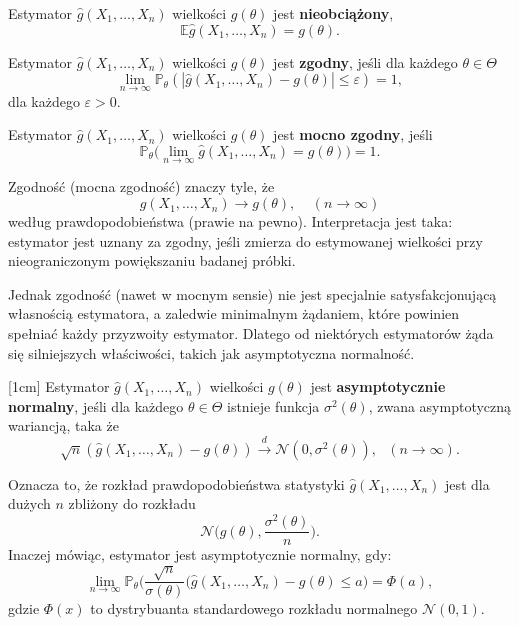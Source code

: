 \begin{definition}
Estymator $\hat{g}(X_1, \dots , X_n)$ wielkości $g(\theta)$ jest \textbf{nieobciążony},  
$$\mathbb{E}\hat{g}(X_1, \dots , X_n) = g(\theta).$$

\end{definition}

\begin{definition}
Estymator $\hat{g}(X_1, \dots , X_n)$ wielkości $g(\theta)$ jest \textbf{zgodny},
jeśli dla każdego $\theta \in \Theta$
$$ \lim\limits_{n \rightarrow \infty} \mathbb{P}_{\theta}(|\hat{g}(X_1,\dots,X_n) -g(\theta)| \leq \varepsilon ) = 1,$$
dla każdego $\varepsilon > 0.$
\end{definition}

\begin{definition}
Estymator $\hat{g}(X_1, \dots , X_n)$ wielkości $g(\theta)$ jest \textbf{mocno zgodny},
jeśli %
$$\mathbb{P}_{\theta}\Big(\lim\limits_{n \rightarrow \infty}\hat{g}(X_1,\dots,X_n)=g(\theta) \Big) = 1.$$
\end{definition}


Zgodność (mocna zgodność) znaczy tyle, że
$$\hat{g}(X_1, \dots , X_n) \rightarrow g(\theta), \ \ \ \ \ (n \rightarrow \infty)$$
według prawdopodobieństwa (prawie na pewno). Interpretacja jest taka: estymator jest uznany za
zgodny, jeśli zmierza do estymowanej wielkości przy nieograniczonym powiększaniu badanej próbki.

Jednak zgodność (nawet w mocnym sensie) nie jest specjalnie satysfakcjonującą własnością estymatora,
a zaledwie minimalnym żądaniem, które powinien spełniać każdy przyzwoity estymator. Dlatego od niektórych estymatorów żąda się silniejszych właściwości, takich jak asymptotyczna normalność.

\begin{definition}
[1cm]
Estymator $\hat{g}(X_1, \dots , X_n)$ wielkości $g(\theta)$ jest \textbf{asymptotycznie normalny}, jeśli dla każdego $\theta \in \Theta$ istnieje funkcja $\sigma^2(\theta)$, zwana asymptotyczną wariancją, taka że
$$\sqrt{n}(\hat{g}(X_1,\dots,X_n) -g(\theta))  \overset{d}{\rightarrow} \mathcal{N}(0, \sigma^2(\theta)), \ \ \ (n \rightarrow \infty).$$
\end{definition}


Oznacza to, że rozkład prawdopodobieństwa statystyki $\hat{g}(X_1,\dots,X_n)$ jest dla dużych $n$ zbliżony do rozkładu $$\mathcal{N}\Big(g(\theta), \dfrac{\sigma^2(\theta)}{n}\Big).$$ Inaczej mówiąc, estymator jest asymptotycznie normalny, gdy: 
$$\lim\limits_{n \rightarrow \infty} \mathbb{P}_{\theta} \Big(\dfrac{\sqrt{n}}{\sigma(\theta)}(\hat{g}(X_1,\dots,X_n) -g(\theta) \leq a \Big) = \Phi(a),$$
gdzie $\Phi(x)$ to dystrybuanta standardowego rozkładu normalnego $\mathcal{N}(0,1)$.

